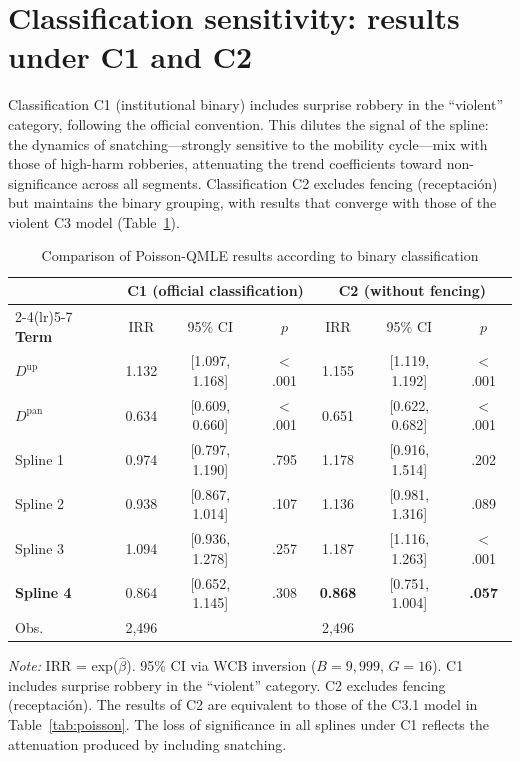 \documentclass[pdflatex,sn-basic]{sn-jnl}
\newcommand{\tablenote}[1]{%
  \vspace{2pt}\par
  {\footnotesize\textit{Note:} #1\par}
}
\begin{document}
\section{Classification sensitivity: results under C1 and C2}
\label{ap:clasif}

Classification C1 (institutional binary) includes surprise robbery
in the ``violent'' category, following the official convention. This dilutes the
signal of the spline: the dynamics of snatching---strongly sensitive to the mobility
cycle---mix with those of high-harm robberies, attenuating the trend
coefficients toward non-significance across all segments. Classification C2 excludes
fencing (receptaci\'on) but maintains the binary grouping, with results that converge
with those of the violent C3 model (Table~\ref{tab:clasif}).

\begin{table}[htbp]
\centering
\caption{Comparison of Poisson-QMLE results according to binary classification}
\label{tab:clasif}
\footnotesize
\begin{tabular}{l@{\hskip 3mm}ccc@{\hskip 4mm}ccc}
\toprule
 & \multicolumn{3}{c}{\textbf{C1 (official classification)}} &
   \multicolumn{3}{c}{\textbf{C2 (without fencing)}} \\
\cmidrule(lr){2-4}\cmidrule(lr){5-7}
\textbf{Term} & IRR & 95\% CI & $p$ & IRR & 95\% CI & $p$ \\
\midrule
$D^{\text{up}}$ & 1.132 & [1.097, 1.168] & $<$.001 & 1.155 & [1.119, 1.192] & $<$.001 \\
$D^{\text{pan}}$ & 0.634 & [0.609, 0.660] & $<$.001 & 0.651 & [0.622, 0.682] & $<$.001 \\
\midrule
Spline 1 & 0.974 & [0.797, 1.190] & .795 & 1.178 & [0.916, 1.514] & .202 \\
Spline 2 & 0.938 & [0.867, 1.014] & .107 & 1.136 & [0.981, 1.316] & .089 \\
Spline 3 & 1.094 & [0.936, 1.278] & .257 & 1.187 & [1.116, 1.263] & $<$.001 \\
\textbf{Spline 4} & 0.864 & [0.652, 1.145] & .308 & \textbf{0.868} & [0.751, 1.004] & \textbf{.057} \\
\midrule
Obs. & 2,496 & & & 2,496 & & \\
\bottomrule
\end{tabular}
\tablenote{IRR = exp($\hat{\beta}$). 95\% CI via WCB inversion ($B=9,999$,
$G=16$). C1 includes surprise robbery in the ``violent'' category. C2 excludes fencing (receptaci\'on).
The results of C2 are equivalent to those of the C3.1 model in
Table~\ref{tab:poisson}. The loss of significance in all splines under C1
reflects the attenuation produced by including snatching.}
\end{table}
\end{document}
